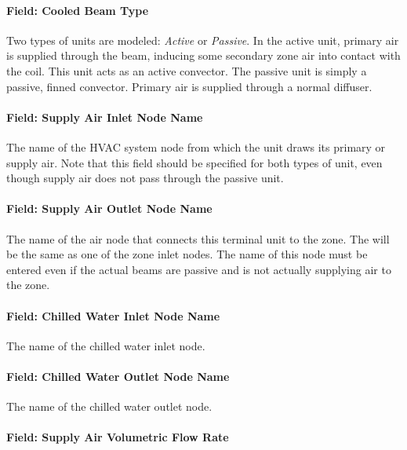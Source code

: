 \paragraph{Field: Cooled Beam Type}\label{field-cooled-beam-type}

Two types of units are modeled: \emph{Active} or \emph{Passive}. In the active unit, primary air is supplied through the beam, inducing some secondary zone air into contact with the coil. This unit acts as an active convector. The passive unit is simply a passive, finned convector. Primary air is supplied through a normal diffuser.

\paragraph{Field: Supply Air Inlet Node Name}\label{field-supply-air-inlet-node-name-3}

The name of the HVAC system node from which the unit draws its primary or supply air. Note that this field should be specified for both types of unit, even though supply air does not pass through the passive unit.

\paragraph{Field: Supply Air Outlet Node Name}\label{field-supply-air-outlet-node-name}

The name of the air node that connects this terminal unit to the zone. The will be the same as one of the zone inlet nodes. The name of this node must be entered even if the actual beams are passive and is not actually supplying air to the zone.

\paragraph{Field: Chilled Water Inlet Node Name}\label{field-chilled-water-inlet-node-name-1}

The name of the chilled water inlet node.

\paragraph{Field: Chilled Water Outlet Node Name}\label{field-chilled-water-outlet-node-name-1}

The name of the chilled water outlet node.

\paragraph{Field: Supply Air Volumetric Flow Rate}\label{field-supply-air-volumetric-flow-rate}


